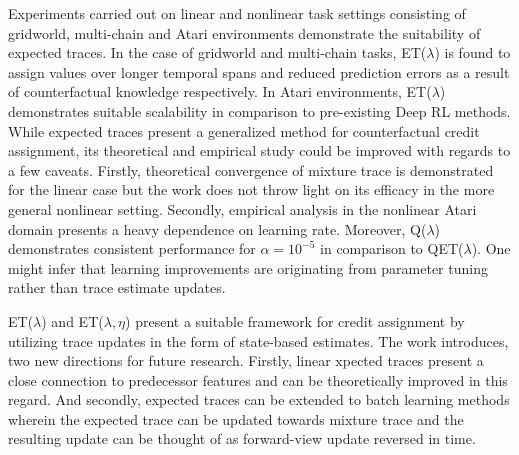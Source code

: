 \documentclass[11pt,letterpaper]{article}
\begin{document}
Experiments carried out on linear and nonlinear task settings consisting of gridworld, multi-chain and Atari environments demonstrate the suitability of expected traces. In the case of gridworld and multi-chain tasks, ET($\lambda$) is found to assign values over longer temporal spans and reduced prediction errors as a result of counterfactual knowledge respectively. In Atari environments, ET($\lambda$) demonstrates suitable scalability in comparison to pre-existing Deep RL methods. While expected traces present a generalized method for counterfactual credit assignment, its theoretical and empirical study could be improved with regards to a few caveats. Firstly, theoretical convergence of mixture trace is demonstrated for the linear case but the work does not throw light on its efficacy in the more general nonlinear setting. Secondly, empirical analysis in the nonlinear Atari domain presents a heavy dependence on learning rate. Moreover, Q($\lambda$) demonstrates consistent performance for $\alpha=10^{-5}$ in comparison to QET($\lambda$). One might infer that learning improvements are originating from parameter tuning rather than trace estimate updates. 

ET($\lambda$) and ET($\lambda,\eta$) present a suitable framework for credit assignment by utilizing trace updates in the form of state-based estimates. The work introduces, two new directions for future research. Firstly, linear xpected traces present a close connection to predecessor features and can be theoretically improved in this regard. And secondly, expected traces can be extended to batch learning methods wherein the expected trace can be updated towards mixture trace and the resulting update can be thought of as forward-view update reversed in time. 
\end{document}
